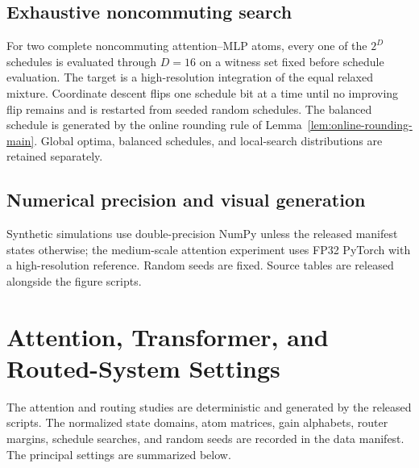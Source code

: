 \documentclass[twoside,11pt]{article}
\begin{document}
\subsection{Exhaustive noncommuting search}
For two complete noncommuting attention--MLP atoms, every one of the $2^D$
schedules is evaluated through $D=16$ on a witness set fixed before schedule
evaluation.  The target is a high-resolution integration of the equal relaxed
mixture.  Coordinate descent flips one schedule bit at a time until no
improving flip remains and is restarted from seeded random schedules.  The
balanced schedule is generated by the online rounding rule of
Lemma~\ref{lem:online-rounding-main}.  Global optima, balanced schedules, and
local-search distributions are retained separately.

\subsection{Numerical precision and visual generation}
Synthetic simulations use double-precision NumPy unless the released manifest
states otherwise; the medium-scale attention experiment uses FP32 PyTorch with
a high-resolution reference.  Random seeds are fixed.  Source
tables are released alongside the figure scripts.

\section{Attention, Transformer, and Routed-System Settings}
\label{app:transformer-experiments}

The attention and routing studies are deterministic and generated by the
released scripts.  The normalized state domains, atom matrices, gain
alphabets, router margins, schedule searches, and random seeds are recorded in
the data manifest.  The principal settings are summarized below.
\end{document}
